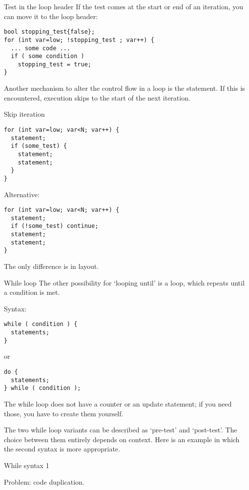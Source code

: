 \begin{block}{Test in the loop header}
  \label{sl:looptest}
  If the test comes at the start or end of an iteration, you can move it
  to the loop header:
\begin{lstlisting}
bool stopping_test{false};
for (int var=low; !stopping_test ; var++) {
  ... some code ...
  if ( some condition )
    stopping_test = true;
}
\end{lstlisting}
\end{block}

Another mechanism to alter the control flow in a loop is the
 statement. If this is encountered, execution
skips to the start of the next iteration.

\begin{block}{Skip iteration}
  \label{sl:for-cont}
\begin{lstlisting}
for (int var=low; var<N; var++) {
  statement;
  if (some_test) {
    statement;
    statement;
  }
}
\end{lstlisting}
Alternative:
\begin{lstlisting}
for (int var=low; var<N; var++) {
  statement;
  if (!some_test) continue;
  statement;
  statement;
}
\end{lstlisting}
The only difference is in layout.
\end{block}

\begin{block}{While loop}
  \label{sl:while}
  The other possibility for `looping until' is a
   loop, which repeats until a condition is met.

  Syntax:
\begin{lstlisting}
while ( condition ) {
  statements;
}
\end{lstlisting}
or
\begin{lstlisting}
do {
  statements;
} while ( condition );
\end{lstlisting}
The while loop does not have a counter or an update statement; if you
need those, you have to create them yourself.
\end{block}

The two while loop variants can be described as `pre-test' and
`post-test'. The choice between them entirely depends on context. Here
is an example in which the second syntax is more appropriate.

\begin{block}{While syntax 1}
  \label{sl:while2}

  Problem: code duplication.
\end{block}

